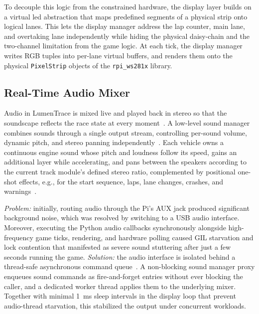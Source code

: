 \documentclass[10pt,journal,final,a4paper]{IEEEtran}
\begin{document}
To decouple this logic from the constrained hardware, the display layer builds on a virtual led abstraction that maps predefined segments of a physical strip onto logical lanes. This lets the display manager address the lap counter, main lane, and overtaking lane independently while hiding the physical daisy-chain and the two-channel limitation from the game logic. At each tick, the display manager writes RGB tuples into per-lane virtual buffers, and renders them onto the physical \texttt{PixelStrip} objects of the \texttt{rpi\_ws281x} library.

\subsection{Real-Time Audio Mixer}
\label{subsec:real-time-audio-mixer}

Audio in LumenTrace is mixed live and played back in stereo so that the soundscape reflects the race state at every moment~\cite{gardenfors:2003designing,gan:2019self}. 
A low-level sound manager combines sounds through a single output stream, controlling per-sound volume, dynamic pitch, and stereo panning independently~\cite{geier:2024sounddevice,bechtold:2026soundfile,harris:2020array}. Each vehicle owns a continuous engine sound whose pitch and loudness follow its speed, gains an additional layer while accelerating, and pans between the speakers according to the current track module's defined stereo ratio, complemented by positional one-shot effects, e.g., for the start sequence, laps, lane changes, crashes, and warnings~\cite{pixabay:2026pixabay}.

\textit{Problem:} initially, routing audio through the Pi's AUX jack produced significant background noise, which was resolved by switching to a USB audio interface. Moreover, executing the Python audio callbacks synchronously alongside high-frequency game ticks, rendering, and hardware polling caused GIL starvation and lock contention that manifested as severe sound stuttering after just a few seconds running the game. 
\textit{Solution:} the audio interface is isolated behind a thread-safe asynchronous command queue~\cite{tsigas:2001simple,eggen:2019thread}. A non-blocking sound manager proxy enqueues sound commands as fire-and-forget entries without ever blocking the caller, and a dedicated worker thread applies them to the underlying mixer. Together with minimal \SI{1}{\milli\second} sleep intervals in the display loop that prevent audio-thread starvation, this stabilized the output under concurrent workloads.
\end{document}
